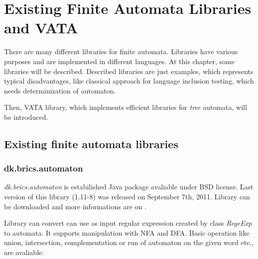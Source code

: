 \begin{comment}
\section{Simulation}
\label{sim}
		Antichain algorithm is based on pruning out unnecassary states for checking the language inclusion. For this state reduction algorithm 
		needs to compute the simulation on the states of automata.
		\begin{definition}
			A \emph{Simulation} on $\mathcal{A}=(\Sigma,Q,I,F,\delta)$ is relation $\preceq\  \subseteq Q \times Q$ such that $p \preceq r$ only if (i) $p \in F 
			\Rightarrow r \in F$ and (ii) for every transition $p \xrightarrow{a} p'$, there exists transition $r \xrightarrow{a} r'$ such that $p' \preceq r'$ 
		\cite{simulations}.
		\end{definition}
\end{comment}

\chapter{Existing Finite Automata Libraries and VATA} %
\label{libraries}
There are many different libraries for finite automata. Libraries have various purposes and 
are implemented in different languages. 
At this chapter, some libraries will be described. Described libraries are just examples, which represents typical disadvantages, like
classical approach for language inclusion testing, which needs determinization of automaton. 

Then, VATA library, which implements efficient libraries for \emph{tree} automata, will be introduced.

\section{Existing finite automata libraries}
\label{existinglibraries}
\subsection{dk.brics.automaton}
\label{brics}
\emph{dk.brics.automaton} is estabilished Java package avaliable under BSD license. Last version of this library (1.11-8) was released on September 7th, 2011.
Library can be downloaded and more informations are on \cite{brics}. 

Library can convert can use as input regular expression created by class \emph{RegeExp} to automata.
It supports manipulation with NFA and DFA. Basic operation like union,
intersection, complementation or run of automaton on the given word etc., are avaliable.

